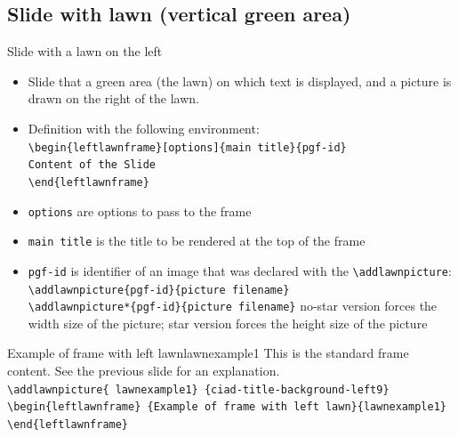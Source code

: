\documentclass[english,sectioncirclenumberstyle]{ciadbeamer}
\begin{document}
\subsection{Slide with lawn (vertical green area)}
\subsectiontableofcontentslide

\begin{frame}{Slide with a lawn on the left}
	\begin{itemize}
		\item Slide that a green area (the lawn) on which text is displayed, and a picture is drawn on the right of the lawn.
		\item Definition with the following environment: \\
		\texttt{{\textbackslash}begin\{leftlawnframe\}[options]\{main title\}\{pgf-id\}} \\
		\texttt{Content of the Slide} \\
		\texttt{{\textbackslash}end\{leftlawnframe\}}
		\item \texttt{options} are options to pass to the frame
		\item \texttt{main title} is the title to be rendered at the top of the frame
		\item \texttt{pgf-id} is identifier of an image that was declared with the \texttt{{\textbackslash}addlawnpicture}: \\
		\texttt{{\textbackslash}addlawnpicture\{pgf-id\}\{picture filename\}} \\
		\texttt{{\textbackslash}addlawnpicture*\{pgf-id\}\{picture filename\}}
		no-star version forces the width size of the picture; star version forces the height size of the picture
	\end{itemize}
\end{frame}

\begin{leftlawnframe}{{Example of frame} with left lawn}{lawnexample1}
	This is the standard frame content. See the previous slide for an explanation. \\[.5cm]
	\smaller
	\texttt{{\textbackslash}addlawnpicture\{ lawnexample1\} \{ciad-title-background-left9\}} \\
	\texttt{{\textbackslash}begin\{leftlawnframe\} \{Example of frame with left lawn\}\{lawnexample1\}} \\
	\texttt{{\textbackslash}end\{leftlawnframe\}}
\end{leftlawnframe}
\end{document}
